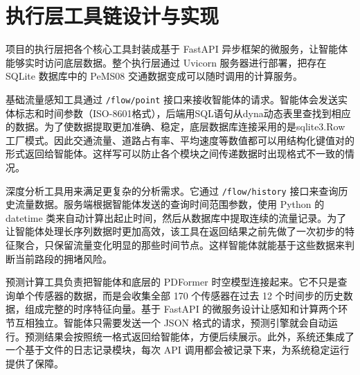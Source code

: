 \section{执行层工具链设计与实现}

项目的执行层把各个核心工具封装成基于 FastAPI 异步框架的微服务，让智能体能够实时访问底层数据。整个执行层通过 Uvicorn 服务器进行部署，把存在 SQLite 数据库中的 PeMS08 交通数据变成可以随时调用的计算服务。

基础流量感知工具通过 \texttt{/flow/point} 接口来接收智能体的请求。智能体会发送实体标志和时间参数（ISO-8601格式），后端用SQL语句从dyna动态表里查找到相应的数据。为了使数据提取更加准确、稳定，底层数据库连接采用的是sqlite3.Row工厂模式。因此交通流量、道路占有率、平均速度等数值都可以用结构化键值对的形式返回给智能体。这样写可以防止各个模块之间传递数据时出现格式不一致的情况。

深度分析工具用来满足更复杂的分析需求。它通过 \texttt{/flow/history} 接口来查询历史流量数据。服务端根据智能体发送的查询时间范围参数，使用 Python 的 datetime 类来自动计算出起止时间，然后从数据库中提取连续的流量记录。为了让智能体处理长序列数据时更加高效，该工具在返回结果之前先做了一次初步的特征聚合，只保留流量变化明显的那些时间节点。这样智能体就能基于这些数据来判断当前路段的拥堵风险。

预测计算工具负责把智能体和底层的 PDFormer 时空模型连接起来。它不只是查询单个传感器的数据，而是会收集全部 170 个传感器在过去 12 个时间步的历史数据，组成完整的时序特征向量。基于 FastAPI 的微服务设计让感知和计算两个环节互相独立。智能体只需要发送一个 JSON 格式的请求，预测引擎就会自动运行。预测结果会按照统一格式返回给智能体，方便后续展示。此外，系统还集成了一个基于文件的日志记录模块，每次 API 调用都会被记录下来，为系统稳定运行提供了保障。
